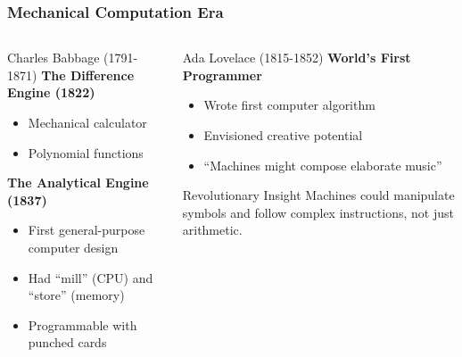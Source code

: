\documentclass{beamer}
\begin{document}
\begin{frame}
    \frametitle{Mechanical Computation Era}
    \begin{columns}
        \begin{column}{0.48\textwidth}
            \begin{block}{Charles Babbage (1791-1871)}
                \textbf{The Difference Engine (1822)}
                \begin{itemize}
                    \item Mechanical calculator
                    \item Polynomial functions
                \end{itemize}
                
                \textbf{The Analytical Engine (1837)}
                \begin{itemize}
                    \item First general-purpose computer design
                    \item Had ``mill'' (CPU) and ``store'' (memory)
                    \item Programmable with punched cards
                \end{itemize}
            \end{block}
        \end{column}
        \begin{column}{0.48\textwidth}
            \begin{alertblock}{Ada Lovelace (1815-1852)}
                \textbf{World's First Programmer}
                \begin{itemize}
                    \item Wrote first computer algorithm
                    \item Envisioned creative potential
                    \item ``Machines might compose elaborate music''
                \end{itemize}
            \end{alertblock}
            
            \begin{exampleblock}{Revolutionary Insight}
                Machines could manipulate symbols and follow complex instructions, not just arithmetic.
            \end{exampleblock}
        \end{column}
    \end{columns}
\end{frame}
\end{document}
